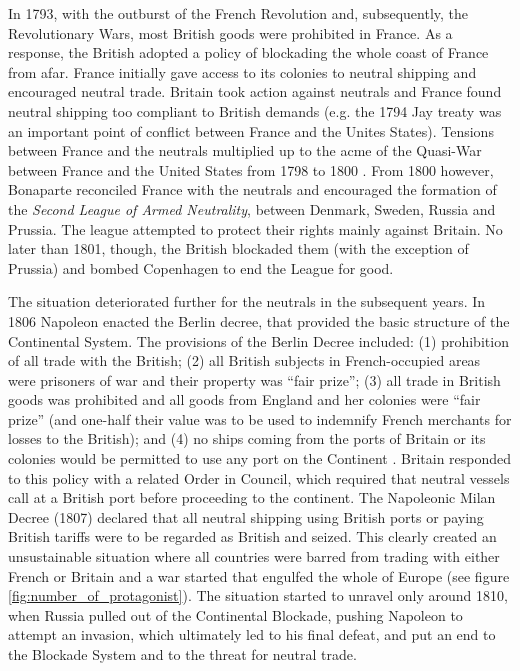 \documentclass[12pt,a4paper,notitlepage,english]{article}
\begin{document}
In 1793, with the outburst of the French Revolution and, subsequently, the Revolutionary Wars, most British goods were prohibited in France.
As a response, the British adopted a policy of blockading the whole coast of France from afar.
France initially gave access to its colonies to neutral shipping and encouraged neutral trade.
Britain took action against neutrals and France found neutral shipping too compliant to British demands (e.g. the 1794 Jay treaty was an important point of conflict between France and the Unites States).
Tensions between France and the neutrals multiplied up to the acme of the Quasi-War between France and the United States from 1798 to 1800 \cite[pp. 106-118]{Marzagalli2015a}. 
From 1800 however, Bonaparte reconciled France with the neutrals and encouraged the formation of the \textit{Second League of Armed Neutrality}, between Denmark, Sweden, Russia and Prussia.
The league attempted to protect their rights mainly against Britain. 
No later than 1801, though, the British blockaded them (with the exception of Prussia) and bombed Copenhagen to end the League for good.

The situation deteriorated further for the neutrals in the subsequent years.
In 1806 Napoleon enacted the Berlin decree, that provided the basic structure of the Continental System.
The provisions of the Berlin Decree included: (1) prohibition of all trade with the British; (2) all British subjects in French-occupied areas were prisoners of war and their property was ``fair prize''; (3) all trade in British goods was prohibited and all goods from England and her colonies were ``fair prize'' (and one-half their value was to be used to indemnify French merchants for losses to the British); and (4) no ships coming from the ports of Britain or its colonies would be permitted to use any port on the Continent \citep{Davis2006}.
Britain responded to this policy with a related Order in Council, which required that neutral vessels call at a British port before proceeding to the continent.
The Napoleonic Milan Decree (1807) declared that all neutral shipping using British ports or paying British tariffs were to be regarded as British and seized.
This clearly created an unsustainable situation where all countries were barred from trading with either French or Britain and a war started that engulfed the whole of Europe (see figure \ref{fig:number_of_protagonist}).
The situation started to unravel only around 1810, when Russia pulled out of the Continental Blockade, pushing Napoleon to attempt an invasion, which ultimately led to his final defeat, and put an end to the Blockade System and to the threat for neutral trade. 
\end{document}
